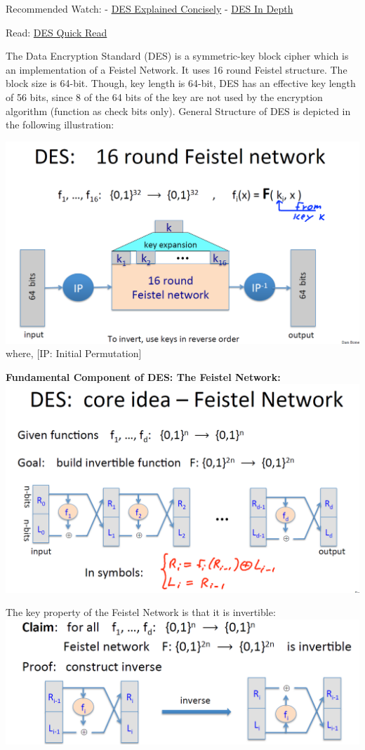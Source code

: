\documentclass[11pt]{article}
\makeatletter
\def\maxwidth{\ifdim\Gin@nat@width>\linewidth\linewidth
    \else\Gin@nat@width\fi}
\let\Oldincludegraphics\includegraphics
\renewcommand{\includegraphics}[1]{\Oldincludegraphics[width=.8\maxwidth]{#1}}
\makeatother
\begin{document}
Recommended Watch: -
\href{https://www.youtube.com/watch?v=Y61qn_SQl40}{DES Explained
Concisely} -
\href{https://www.coursera.org/learn/crypto/lecture/TzBaf/the-data-encryption-standard}{DES
In Depth}

Read:
\href{https://www.tutorialspoint.com/cryptography/data_encryption_standard.htm}{DES
Quick Read}

The Data Encryption Standard (DES) is a symmetric-key block cipher which
is an implementation of a Feistel Network. It uses 16 round Feistel
structure. The block size is 64-bit. Though, key length is 64-bit, DES
has an effective key length of 56 bits, since 8 of the 64 bits of the
key are not used by the encryption algorithm (function as check bits
only). General Structure of DES is depicted in the following
illustration:

\includegraphics{./Images/DES.png} where, {[}IP: Initial Permutation{]}

\textbf{Fundamental Component of DES: The Feistel Network:}
\includegraphics{./Images/FeistelNetwork.png}

The key property of the Feistel Network is that it is invertible:
\includegraphics{./Images/Invertible-Feistel.png}
\end{document}

